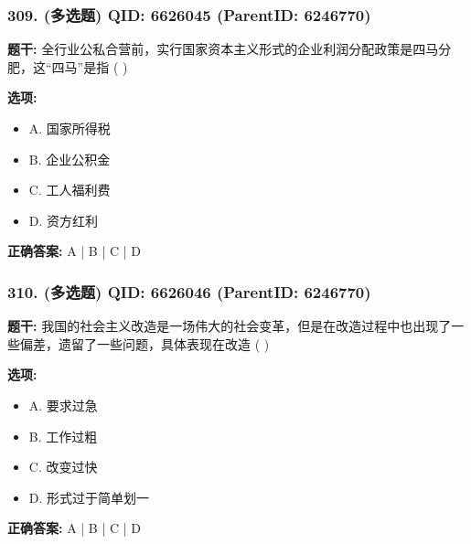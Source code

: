 \documentclass[12pt,UTF8]{ctexart}
\begin{document}
\subsubsection*{309. (多选题) \small QID: 6626045 (ParentID: 6246770)}

\textbf{题干:}
全行业公私合营前，实行国家资本主义形式的企业利润分配政策是四马分肥，这“四马”是指  ( )



\textbf{选项:}
\begin{itemize}[leftmargin=*]

  \item A. 国家所得税

  \item B. 企业公积金

  \item C. 工人福利费

  \item D. 资方红利

\end{itemize}

\textbf{正确答案:}
A | B | C | D

\vspace{0.3em}\hrulefill\vspace{0.7em}

\subsubsection*{310. (多选题) \small QID: 6626046 (ParentID: 6246770)}

\textbf{题干:}
我国的社会主义改造是一场伟大的社会变革，但是在改造过程中也出现了一些偏差，遗留了一些问题，具体表现在改造  ( )



\textbf{选项:}
\begin{itemize}[leftmargin=*]

  \item A. 要求过急

  \item B. 工作过粗

  \item C. 改变过快

  \item D. 形式过于简单划一

\end{itemize}

\textbf{正确答案:}
A | B | C | D

\vspace{0.3em}\hrulefill\vspace{0.7em}
\end{document}
